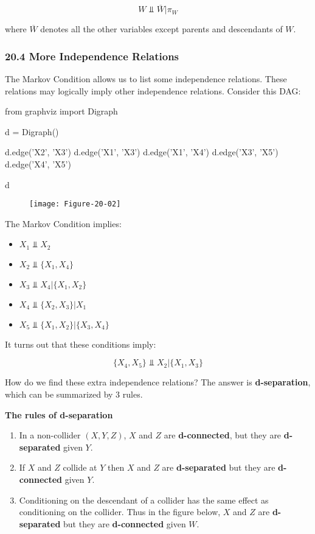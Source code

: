 \[W \text{ ⫫ } \overline{W} | \pi_W \]

where \(\overline{W}\) denotes all the other variables except parents
and descendants of \(W\).

\subsubsection{20.4 More Independence Relations}\label{more-independence-relations}

The Markov Condition allows us to list some independence relations.
These relations may logically imply other independence relations.
Consider this DAG:

\begin{python}
from graphviz import Digraph

d = Digraph()

d.edge('X2', 'X3')
d.edge('X1', 'X3')
d.edge('X1', 'X4')
d.edge('X3', 'X5')
d.edge('X4', 'X5')

d
\end{python}
 
\begin{figure}[H]
\texttt{[image: Figure-20-02]}
\end{figure}


The Markov Condition implies:

\begin{itemize}[tightlist]
\item
  \(X_1 \text{ ⫫ } X_2\)
\item
  \(X_2 \text{ ⫫ } \{ X_1, X_4 \}\)
\item
  \(X_3 \text{ ⫫ } X_4 | \{ X_1, X_2 \}\)
\item
  \(X_4 \text{ ⫫ } \{ X_2, X_3 \} | X_1\)
\item
  \(X_5 \text{ ⫫ } \{ X_1, X_2 \} | \{X_3, X_4\}\)
\end{itemize}

It turns out that these conditions imply:

\[ \{ X_4, X_5 \} \text{ ⫫ } X_2 | \{ X_1, X_3 \} \]

How do we find these extra independence relations? The answer is
\textbf{d-separation}, which can be summarized by 3 rules.

\textbf{The rules of d-separation}

\begin{enumerate}[tightlist,label={\arabic*.}]
\item
  In a non-collider \((X, Y, Z)\), \(X\) and \(Z\) are
  \textbf{d-connected}, but they are \textbf{d-separated} given \(Y\).
\item
  If \(X\) and \(Z\) collide at \(Y\) then \(X\) and \(Z\) are
  \textbf{d-separated} but they are \textbf{d-connected} given \(Y\).
\item
  Conditioning on the descendant of a collider has the same effect as
  conditioning on the collider. Thus in the figure below, \(X\) and
  \(Z\) are \textbf{d-separated} but they are \textbf{d-connected} given
  \(W\).
\end{enumerate}

